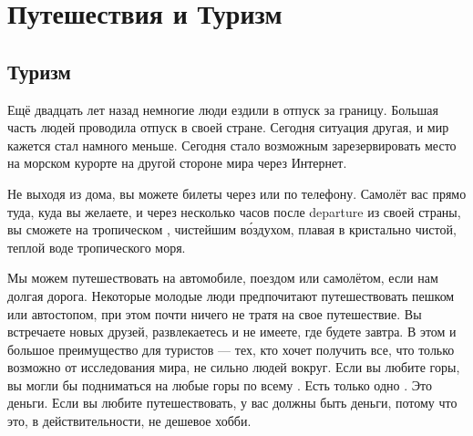 \chapter{Путешествия и Туризм}

\section{Туризм}
Ещё двадцать лет назад немногие люди ездили в отпуск за границу. Большая часть людей проводила отпуск в своей стране. Сегодня ситуация другая, и мир кажется стал намного меньше. Сегодня стало возможным зарезервировать место на морском курорте на другой стороне мира через Интернет.

Не выходя из дома, вы можете  билеты через  или по телефону. Самолёт  вас прямо туда, куда вы желаете, и через несколько часов после  {departure} из своей страны, вы сможете  на тропическом ,  чистейшим в\'{о}здухом, плавая в кристально чистой, теплой воде тропического моря.

Мы можем путешествовать на автомобиле, поездом или самолётом, если нам  долгая дорога. Некоторые молодые люди предпочитают путешествовать пешком или автостопом, при этом почти ничего не тратя на свое путешествие. Вы встречаете новых друзей, развлекаетесь и  не имеете, где будете завтра. В этом и  большое преимущество для туристов --- тех, кто хочет получить все, что только возможно от исследования мира,  не сильно  людей вокруг. Если вы любите горы, вы могли бы подниматься на любые горы по всему . Есть только одно . Это деньги. Если вы любите путешествовать, у вас должны быть деньги, потому что это, в действительности, не дешевое хобби.

